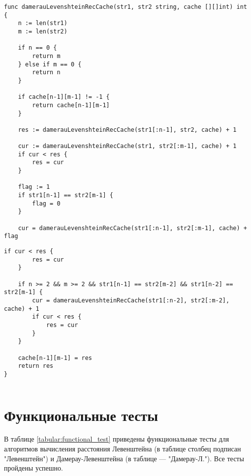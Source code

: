 \begin{lstlisting}[label=lst:DLMatr,caption=Функция нахождения расстояния Дамерау-Левенштейна с использованием рекурсии с кешем (начало)]
func damerauLevenshteinRecCache(str1, str2 string, cache [][]int) int {
	n := len(str1)
	m := len(str2)
	
	if n == 0 {
		return m
	} else if m == 0 {
		return n
	}
	
	if cache[n-1][m-1] != -1 {
		return cache[n-1][m-1]
	}
	
	res := damerauLevenshteinRecCache(str1[:n-1], str2, cache) + 1
	
	cur := damerauLevenshteinRecCache(str1, str2[:m-1], cache) + 1
	if cur < res {
		res = cur
	}

	flag := 1
	if str1[n-1] == str2[m-1] {
		flag = 0
	}
	
	cur = damerauLevenshteinRecCache(str1[:n-1], str2[:m-1], cache) + flag
\end{lstlisting}

\clearpage
\begin{lstlisting}[caption=Функция нахождения расстояния Дамерау-Левенштейна с использованием рекурсии с кешем (окончание)]		
	if cur < res {
		res = cur
	}
	
	if n >= 2 && m >= 2 && str1[n-1] == str2[m-2] && str1[n-2] == str2[m-1] {
		cur = damerauLevenshteinRecCache(str1[:n-2], str2[:m-2], cache) + 1
		if cur < res {
			res = cur
		}
	}
	
	cache[n-1][m-1] = res
	return res
}
	
\end{lstlisting}

\clearpage
\section{Функциональные тесты}
В таблице \ref{tabular:functional_test} приведены функциональные тесты для алгоритмов вычисления расстояния Левенштейна (в таблице столбец подписан "Левенштейн") и Дамерау-Левенштейна (в таблице --- "Дамерау-Л."). Все тесты пройдены успешно.


